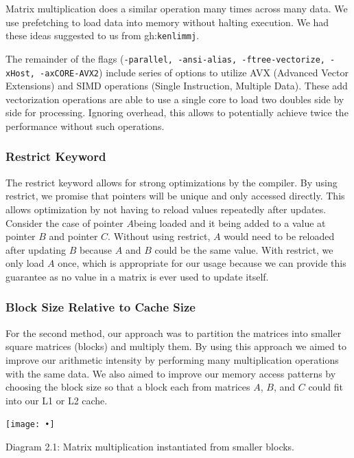 \documentclass[12pt]{article}
\begin{document}
Matrix multiplication does a similar operation many times across many data. We use prefetching to load data into memory without halting execution. We had these ideas suggested to us from gh:\texttt{kenlimmj}.

The remainder of the flags (\texttt{-parallel, -ansi-alias, -ftree-vectorize, -xHost,
-axCORE-AVX2}) include series of options to utilize AVX (Advanced Vector Extensions) and SIMD operations (Single Instruction, Multiple Data).  These add vectorization operations are able to use a single core to load two doubles side by side for processing. Ignoring overhead, this allows to potentially achieve twice the performance without such operations. 

\subsubsection{Restrict Keyword}

The restrict keyword allows for strong optimizations by the compiler. By using restrict, we promise that pointers will be unique and only accessed directly. This allows optimization by not having to reload values repeatedly  after updates. Consider the case of pointer $A $being loaded and it being added to a value at pointer $B$ and pointer $C$. Without using restrict, $A$ would need to be reloaded after updating $B$ because $A$ and $B$ could be the same value.  With restrict, we only load $A$ once, which is appropriate for our usage because we can provide this guarantee as no value in a matrix is ever used to update itself. 


\subsubsection{Block Size Relative to Cache Size}

For the second method, our approach was to partition the matrices into smaller square matrices (blocks) and multiply them. By using this approach we aimed to improve our arithmetic intensity by performing many multiplication operations with the same data. We also aimed to improve our memory access patterns by choosing the block size so that a block each from matrices $A$, $B$, and $C$ could fit into our L1 or L2 cache.

\begin{center}
\texttt{[image: •]}

Diagram 2.1: Matrix multiplication instantiated from smaller blocks.
\end{center}
\end{document}
